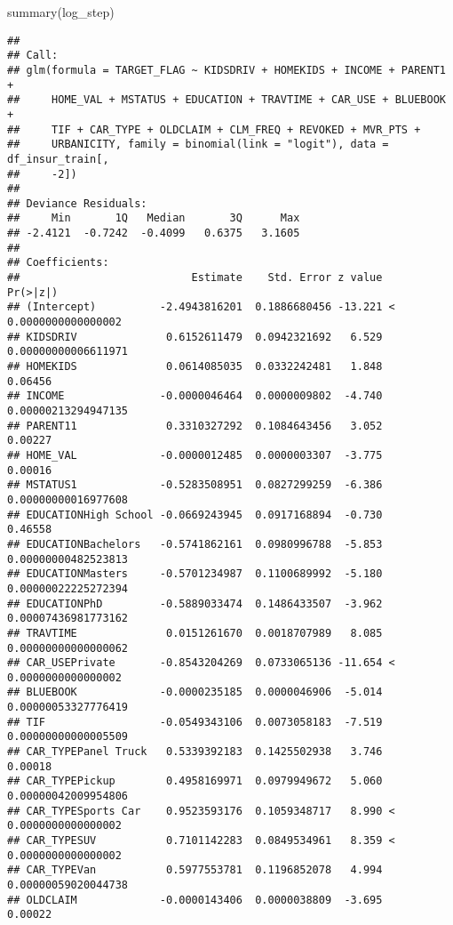 \documentclass[
]{article}
\newenvironment{Shaded}{\begin{snugshade}}{\end{snugshade}}
\newcommand{\FunctionTok}[1]{\textcolor[rgb]{0.00,0.00,0.00}{#1}}
\newcommand{\NormalTok}[1]{#1}
\begin{document}
\begin{Shaded}
\begin{Highlighting}[]
\FunctionTok{summary}\NormalTok{(log\_step)}
\end{Highlighting}
\end{Shaded}

\begin{verbatim}
## 
## Call:
## glm(formula = TARGET_FLAG ~ KIDSDRIV + HOMEKIDS + INCOME + PARENT1 + 
##     HOME_VAL + MSTATUS + EDUCATION + TRAVTIME + CAR_USE + BLUEBOOK + 
##     TIF + CAR_TYPE + OLDCLAIM + CLM_FREQ + REVOKED + MVR_PTS + 
##     URBANICITY, family = binomial(link = "logit"), data = df_insur_train[, 
##     -2])
## 
## Deviance Residuals: 
##     Min       1Q   Median       3Q      Max  
## -2.4121  -0.7242  -0.4099   0.6375   3.1605  
## 
## Coefficients:
##                           Estimate    Std. Error z value             Pr(>|z|)
## (Intercept)          -2.4943816201  0.1886680456 -13.221 < 0.0000000000000002
## KIDSDRIV              0.6152611479  0.0942321692   6.529  0.00000000006611971
## HOMEKIDS              0.0614085035  0.0332242481   1.848              0.06456
## INCOME               -0.0000046464  0.0000009802  -4.740  0.00000213294947135
## PARENT11              0.3310327292  0.1084643456   3.052              0.00227
## HOME_VAL             -0.0000012485  0.0000003307  -3.775              0.00016
## MSTATUS1             -0.5283508951  0.0827299259  -6.386  0.00000000016977608
## EDUCATIONHigh School -0.0669243945  0.0917168894  -0.730              0.46558
## EDUCATIONBachelors   -0.5741862161  0.0980996788  -5.853  0.00000000482523813
## EDUCATIONMasters     -0.5701234987  0.1100689992  -5.180  0.00000022225272394
## EDUCATIONPhD         -0.5889033474  0.1486433507  -3.962  0.00007436981773162
## TRAVTIME              0.0151261670  0.0018707989   8.085  0.00000000000000062
## CAR_USEPrivate       -0.8543204269  0.0733065136 -11.654 < 0.0000000000000002
## BLUEBOOK             -0.0000235185  0.0000046906  -5.014  0.00000053327776419
## TIF                  -0.0549343106  0.0073058183  -7.519  0.00000000000005509
## CAR_TYPEPanel Truck   0.5339392183  0.1425502938   3.746              0.00018
## CAR_TYPEPickup        0.4958169971  0.0979949672   5.060  0.00000042009954806
## CAR_TYPESports Car    0.9523593176  0.1059348717   8.990 < 0.0000000000000002
## CAR_TYPESUV           0.7101142283  0.0849534961   8.359 < 0.0000000000000002
## CAR_TYPEVan           0.5977553781  0.1196852078   4.994  0.00000059020044738
## OLDCLAIM             -0.0000143406  0.0000038809  -3.695              0.00022

\end{verbatim}
\end{document}
